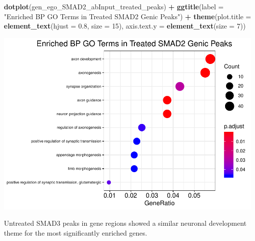 \documentclass[]{article}
\newenvironment{Shaded}{\begin{snugshade}}{\end{snugshade}}
\newcommand{\DataTypeTok}[1]{\textcolor[rgb]{0.13,0.29,0.53}{#1}}
\newcommand{\DecValTok}[1]{\textcolor[rgb]{0.00,0.00,0.81}{#1}}
\newcommand{\FloatTok}[1]{\textcolor[rgb]{0.00,0.00,0.81}{#1}}
\newcommand{\KeywordTok}[1]{\textcolor[rgb]{0.13,0.29,0.53}{\textbf{#1}}}
\newcommand{\NormalTok}[1]{#1}
\newcommand{\OperatorTok}[1]{\textcolor[rgb]{0.81,0.36,0.00}{\textbf{#1}}}
\newcommand{\StringTok}[1]{\textcolor[rgb]{0.31,0.60,0.02}{#1}}
\begin{document}
\clearpage{}

\begin{Shaded}
\begin{Highlighting}[]
\KeywordTok{dotplot}\NormalTok{(gen_ego_SMAD2_abInput_treated_peaks) }\OperatorTok{+}\StringTok{ }\KeywordTok{ggtitle}\NormalTok{(}\DataTypeTok{label =} \StringTok{"Enriched BP GO Terms in Treated SMAD2 Genic Peaks"}\NormalTok{) }\OperatorTok{+}\StringTok{ }\KeywordTok{theme}\NormalTok{(}\DataTypeTok{plot.title =} \KeywordTok{element_text}\NormalTok{(}\DataTypeTok{hjust =} \FloatTok{0.8}\NormalTok{, }\DataTypeTok{size =} \DecValTok{15}\NormalTok{), }\DataTypeTok{axis.text.y =} \KeywordTok{element_text}\NormalTok{(}\DataTypeTok{size =} \DecValTok{7}\NormalTok{))}
\end{Highlighting}
\end{Shaded}

\includegraphics{peak_annotation_go_term_analysis_files/figure-latex/unnamed-chunk-21-1.pdf}

\clearpage{}

Untreated SMAD3 peaks in gene regions showed a similar neuronal
development theme for the most significantly enriched genes.
\end{document}
